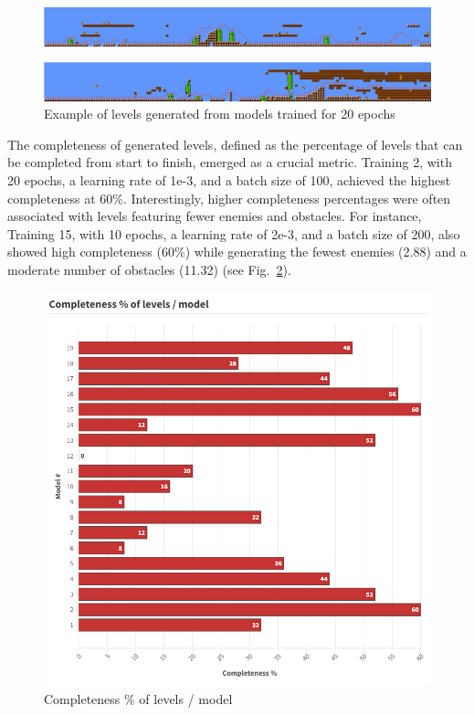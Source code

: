 \documentclass[runningheads]{llncs}
\begin{document}
\begin{figure}
\includegraphics[width=\textwidth]{20_example.png}
\caption{Example of levels generated from models trained for 20 epochs} \label{fig7}
\end{figure}


The completeness of generated levels, defined as the percentage of levels that can be completed from start to finish, emerged as a crucial metric. Training 2, with 20 epochs, a learning rate of 1e-3, and a batch size of 100, achieved the highest completeness at 60\%. Interestingly, higher completeness percentages were often associated with levels featuring fewer enemies and obstacles. For instance, Training 15, with 10 epochs, a learning rate of 2e-3, and a batch size of 200, also showed high completeness (60\%) while generating the fewest enemies (2.88) and a moderate number of obstacles (11.32) (see Fig.~\ref{fig8}).

\begin{figure}
\includegraphics[width=\textwidth]{Completeness percentage of levels _ model.png}
\caption{Completeness \% of levels / model} \label{fig8}
\end{figure}
\end{document}
